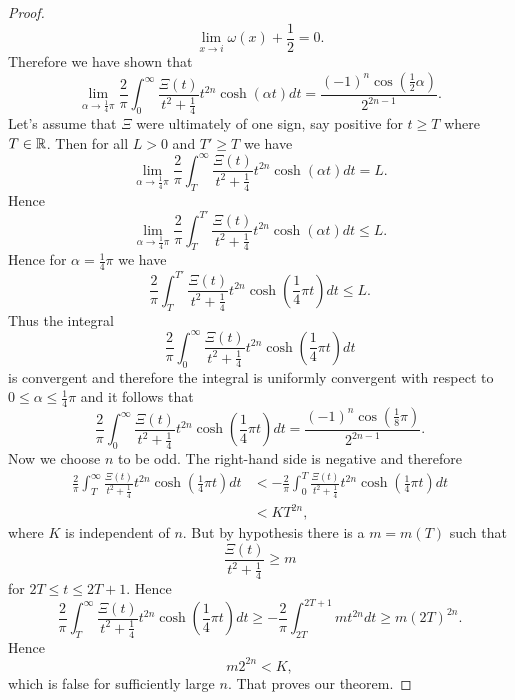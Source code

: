 \begin{proof}
\begin{equation*}
	\lim _{x \to i} \omega(x) + \frac{1}{2} = 0.
\end{equation*}
	Therefore we have shown that
\begin{equation*}
	\lim _{\alpha \to \frac{1}{4} \pi} \frac{2}{\pi} \int _0 ^{\infty} \frac{\Xi(t)}{t^2 + \frac{1}{4}} t^{2n} \cosh(\alpha t) dt = \frac{(-1)^{n} \cos(\frac{1}{2} \alpha)}{2^{2n - 1}}.
\end{equation*}
	Let's assume that $\Xi$ were ultimately of one sign, say positive for $t \geq T$ where $T \in \mathbb{R}$. Then for all $L > 0$ and $T' \geq T$ we have
\begin{equation*}
	\lim _{\alpha \to \frac{1}{4} \pi} \frac{2}{\pi} \int _T ^{\infty} \frac{\Xi(t)}{t^2 + \frac{1}{4}} t^{2n} \cosh(\alpha t) dt = L.
\end{equation*}
	Hence
\begin{equation*}
	\lim _{\alpha \to \frac{1}{4} \pi} \frac{2}{\pi} \int _T ^{T'} \frac{\Xi(t)}{t^2 + \frac{1}{4}} t^{2n} \cosh(\alpha t) dt \leq L.
\end{equation*}
	Hence for $\alpha = \frac{1}{4}\pi$ we have
\begin{equation*}
	\frac{2}{\pi} \int _T ^{T'} \frac{\Xi(t)}{t^2 + \frac{1}{4}} t^{2n} \cosh(\frac{1}{4}\pi t) dt \leq L.
\end{equation*}
	Thus the integral
\begin{equation*}
	\frac{2}{\pi} \int _0 ^{\infty} \frac{\Xi(t)}{t^2 + \frac{1}{4}} t^{2n} \cosh(\frac{1}{4}\pi t) dt
\end{equation*}
	is convergent and therefore the integral is uniformly convergent with respect to $0 \leq \alpha \leq \frac{1}{4}\pi$ and it follows that
\begin{equation*}
	\frac{2}{\pi} \int _0 ^{\infty} \frac{\Xi(t)}{t^2 + \frac{1}{4}} t^{2n} \cosh(\frac{1}{4} \pi t) dt = \frac{(-1)^{n} \cos(\frac{1}{8} \pi)}{2^{2n - 1}}.
\end{equation*}
	Now we choose $n$ to be odd. The right-hand side is negative and therefore
\begin{equation*}
\begin{aligned}
	\frac{2}{\pi} \int _T ^{\infty} \frac{\Xi(t)}{t^2 + \frac{1}{4}} t^{2n} \cosh(\frac{1}{4} \pi t) dt 
		&< - \frac{2}{\pi} \int _0 ^{T} \frac{\Xi(t)}{t^2 + \frac{1}{4}} t^{2n} \cosh(\frac{1}{4} \pi t) dt \\
		&< KT^{2n},
\end{aligned}
\end{equation*}
	where $K$ is independent of $n$. But by hypothesis there is a $m = m(T)$ such that
\begin{equation*}
	\frac{\Xi(t)}{t^2 + \frac{1}{4}} \geq m
\end{equation*}
	for $2T \leq t \leq 2T + 1$. Hence
\begin{equation*}
	\frac{2}{\pi} \int _T ^{\infty} \frac{\Xi(t)}{t^2 + \frac{1}{4}} t^{2n} \cosh(\frac{1}{4} \pi t) dt \geq - \frac{2}{\pi} \int _{2T} ^{2T + 1} mt^{2n} dt \geq m(2T)^{2n}.
\end{equation*}
	Hence
\begin{equation*}
	m2^{2n} < K,
\end{equation*}
	which is false for sufficiently large $n$. That proves our theorem.
\end{proof}